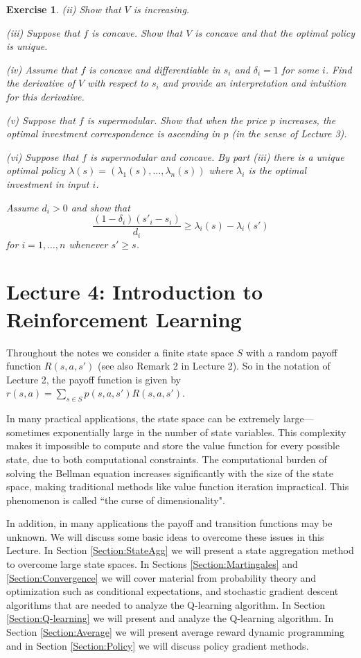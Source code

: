 \documentclass[letter,11pt]{article}
\newtheorem{exercise}{Exercise}[section]
\begin{document}
\begin{exercise}
(ii) Show that $V$ is increasing.

(iii) Suppose that $f$ is concave. Show that $V$ is concave and that the optimal policy is unique. 

(iv) Assume that $f$ is concave and differentiable in $s_{i}$  and $\delta_{i}=1$ for some $i$. Find the derivative of $V$ with respect to $s_{i}$ and provide an interpretation and intuition for this derivative.  

(v) Suppose that $f$ is supermodular. Show that when the price $p$ increases, the optimal investment correspondence is ascending in $p$ (in the sense of Lecture 3). 

(vi) Suppose that $f$ is supermodular and concave. By part (iii) there is a unique optimal policy $\lambda(s)=(\lambda_{1}(s),\ldots,\lambda_{n}(s))$ where $\lambda_{i}$ is the optimal investment in input $i$.

Assume $d_{i}>0$ and show that 
$$ \frac{ (1-\delta_{i})(s'_{i} - s_{i})}{d_{i}} \geq \lambda_{i}(s) - \lambda_{i}(s') $$
for  $i=1,\ldots,n$ whenever $s' \geq s$. 
\end{exercise}


\newpage 

\section{Lecture 4: Introduction to Reinforcement Learning}






Throughout the notes we consider a finite state space $S$ with a random payoff function $R(s,a,s')$ (see also Remark 2 in Lecture 2). So in the notation of Lecture 2, the payoff function is given by $r(s,a) = \sum _{s
 \in S} p(s,a,s')R(s,a,s')$. 

In many practical applications, the state space can be extremely large—sometimes exponentially large in the number of state variables. This complexity makes it impossible to compute and store the value function for every possible state, due to both computational constraints. The computational burden of solving the Bellman equation increases significantly with the size of the state space, making traditional methods like value function iteration impractical. This phenomenon is called ``the curse of dimensionality".  

In addition, in many applications the payoff and transition functions may be unknown. We will discuss some basic ideas to overcome these issues in this Lecture. In Section \ref{Section:StateAgg} we will present a state aggregation method to overcome large state spaces. In Sections \ref{Section:Martingales} and \ref{Section:Convergence} we will cover  material from probability theory and optimization such as conditional expectations, and stochastic gradient descent algorithms that are needed to analyze the Q-learning algorithm. In Section \ref{Section:Q-learning} we will present and analyze the Q-learning algorithm. In Section \ref{Section:Average} we will present average reward dynamic programming and in Section \ref{Section:Policy} we will discuss policy gradient methods. 
\end{document}
